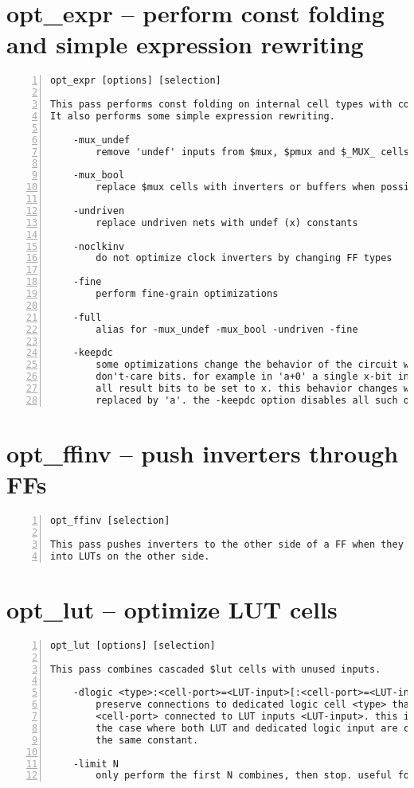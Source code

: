 \section{opt\_expr -- perform const folding and simple expression rewriting}
\label{cmd:opt_expr}
\begin{lstlisting}[numbers=left,frame=single]
    opt_expr [options] [selection]

This pass performs const folding on internal cell types with constant inputs.
It also performs some simple expression rewriting.

    -mux_undef
        remove 'undef' inputs from $mux, $pmux and $_MUX_ cells

    -mux_bool
        replace $mux cells with inverters or buffers when possible

    -undriven
        replace undriven nets with undef (x) constants

    -noclkinv
        do not optimize clock inverters by changing FF types

    -fine
        perform fine-grain optimizations

    -full
        alias for -mux_undef -mux_bool -undriven -fine

    -keepdc
        some optimizations change the behavior of the circuit with respect to
        don't-care bits. for example in 'a+0' a single x-bit in 'a' will cause
        all result bits to be set to x. this behavior changes when 'a+0' is
        replaced by 'a'. the -keepdc option disables all such optimizations.
\end{lstlisting}

\section{opt\_ffinv -- push inverters through FFs}
\label{cmd:opt_ffinv}
\begin{lstlisting}[numbers=left,frame=single]
    opt_ffinv [selection]

This pass pushes inverters to the other side of a FF when they can be merged
into LUTs on the other side.
\end{lstlisting}

\section{opt\_lut -- optimize LUT cells}
\label{cmd:opt_lut}
\begin{lstlisting}[numbers=left,frame=single]
    opt_lut [options] [selection]

This pass combines cascaded $lut cells with unused inputs.

    -dlogic <type>:<cell-port>=<LUT-input>[:<cell-port>=<LUT-input>...]
        preserve connections to dedicated logic cell <type> that has ports
        <cell-port> connected to LUT inputs <LUT-input>. this includes
        the case where both LUT and dedicated logic input are connected to
        the same constant.

    -limit N
        only perform the first N combines, then stop. useful for debugging.
\end{lstlisting}


